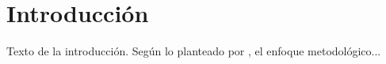 \chapter{Introducción} Texto de la introducción.
Según lo planteado por \cite{ejemplo}, el enfoque metodológico...